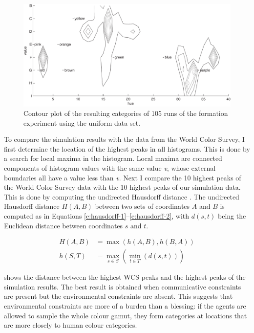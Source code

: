 \begin{figure}[p]
\centering
  \includegraphics[width=.85\textwidth]{./experiments/figures/contour-uniform-language}
  \caption{Contour plot of the resulting categories of 105 runs of the
    formation experiment using the uniform data set.}
\label{f:contour-uniform-language}
\end{figure}

To compare the simulation results with the data from the World Color
Survey, I first determine the location of the highest peaks in all
histograms. This is done by a search for local maxima in the
histogram. Local maxima are connected components of histogram values
with the same value \emph{v}, whose external boundaries all have a
value less than \emph{v}. Next I compare the 10 highest peaks of the
World Color Survey data with the 10 highest peaks of our simulation
data. This is done by computing the undirected Hausdorff distance
\citep{rucklidge97efficiently}. The undirected Hausdorff distance
$H(A, B)$ between two sets of coordinates $A$ and $B$ is computed as
in Equations \ref{e:hausdorff-1}--\ref{e:hausdorff-2}, with $d(s, t)$
being the Euclidean distance between coordinates $s$ and $t$.

\begin{align}
H(A, B)& = \max (h(A,B), h(B,A)) 
\label{e:hausdorff-1} \\
h(S, T)& = \max_{s \in S} \left(\min_{t \in T} \left(d\left(s, t\right)\right)\right)
\label{e:hausdorff-2}
\end{align}

 shows the distance between the
highest WCS peaks and the highest peaks of the simulation results. The
best result is obtained when communicative constraints are present but
the environmental constraints are absent. This suggests that
environmental constraints are more of a burden than a blessing:
if the agents are allowed to sample the whole colour gamut, they form
categories at locations that are more closely to human colour
categories.

